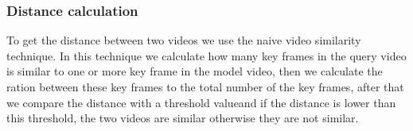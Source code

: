 \subsubsection{Distance calculation}
To get the distance between two videos we use the naive video similarity technique.
In this technique we calculate how many key frames in the query video is similar to one or more key frame in the model video, then 
we calculate the ration between these key frames to the total number of the key frames, after that we compare the distance with a threshold valueand if the 
distance is lower than this threshold, the two videos are similar otherwise they are not similar.
